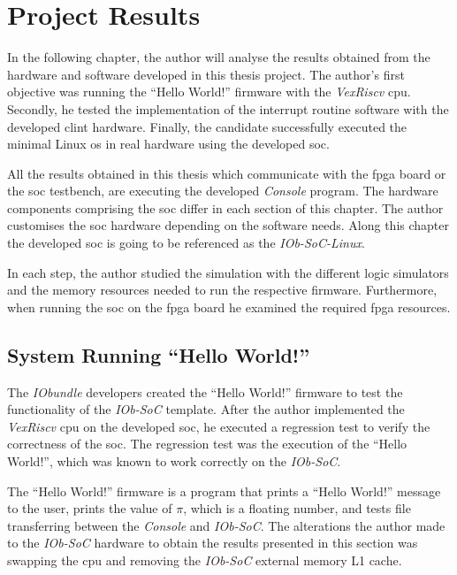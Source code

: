 \chapter{Project Results}
\label{chapter:project_results}
In the following chapter, the author will analyse the results obtained from the hardware and software developed in this thesis project. The author's first objective was running the \enquote{Hello World!} firmware with the \textit{VexRiscv} \acrshort{cpu}. Secondly, he tested the implementation of the interrupt routine software with the developed \acrshort{clint} hardware. Finally, the candidate successfully executed the minimal Linux \acrshort{os} in real hardware using the developed \acrlong{soc}.

All the results obtained in this thesis which communicate with the \acrshort{fpga} board or the \acrshort{soc} testbench, are executing the developed \textit{Console} program. The hardware components comprising the \acrshort{soc} differ in each section of this chapter. The author customises the \acrshort{soc} hardware depending on the software needs. Along this chapter the developed \acrshort{soc} is going to be referenced as the \textit{IOb-SoC-Linux}.

In each step, the author studied the simulation with the different logic simulators and the memory resources needed to run the respective firmware. Furthermore, when running the \acrshort{soc} on the \acrshort{fpga} board he examined the required \acrshort{fpga} resources.

\section{System Running \enquote{Hello World!}}
\label{section:hello_world}
The \textit{IObundle} developers created the \enquote{Hello World!} firmware to test the functionality of the \textit{IOb-SoC} template. After the author implemented the \textit{VexRiscv} \acrshort{cpu} on the developed \acrshort{soc}, he executed a regression test to verify the correctness of the \acrshort{soc}. The regression test was the execution of the \enquote{Hello World!}, which was known to work correctly on the \textit{IOb-SoC}.

The \enquote{Hello World!} firmware is a program that prints a \enquote{Hello World!} message to the user, prints the value of $\pi$, which is a floating number, and tests file transferring between the \textit{Console} and \textit{IOb-SoC}. The alterations the author made to the \textit{IOb-SoC} hardware to obtain the results presented in this section was swapping the \acrshort{cpu} and removing the \textit{IOb-SoC} external memory L1 cache.

